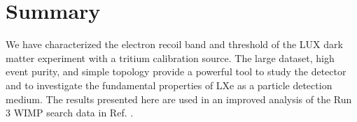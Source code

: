 \section{Summary}

We have characterized the electron recoil band and threshold of the LUX dark matter experiment with a tritium calibration source. The large dataset, high event purity, and simple topology provide a powerful tool to study the detector and to investigate the fundamental properties of LXe as a particle detection medium. The results presented here are used in an improved analysis of the Run 3 WIMP search data in Ref. \cite{lux-reanalysis}.